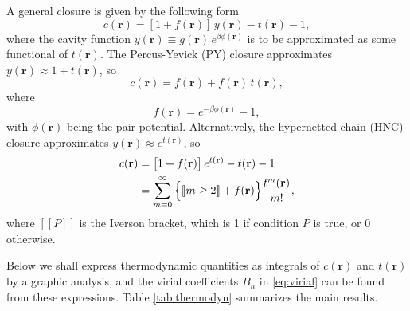 \documentclass[notitlepage,preprint]{revtex4-1}
\newcommand{\vct}[1]{\mathbf{#1}}
\providecommand{\vr}{} %
\renewcommand{\vr}{\vct{r}}
\newcommand{\llbra}{[\![}
\newcommand{\llket}{]\!]}
\begin{document}
A general closure is given by the following form
%
\begin{equation}
  c(\vr) = [1 + f(\vr)] \, y(\vr) - t(\vr) - 1,
  \label{eq:closure}
\end{equation}
%
where the cavity function $y(\vr) \equiv g(\vr) \, e^{ \beta \phi(\vr) }$
  is to be approximated as some functional of $t(\vr)$.
%
The Percus-Yevick (PY) closure\cite{percusyevick}
  approximates $y(\vr) \approx 1 + t(\vr)$, so
%
\begin{equation}
  c(\vr) = f(\vr) + f(\vr) \, t(\vr),
  \label{eq:py}
\end{equation}
where
\begin{equation}
  f(\vr) = e^{-\beta \phi(\vr)} - 1,
  \label{eq:fbond}
\end{equation}
with $\phi(\vr)$ being the pair potential.
%
Alternatively, the hypernetted-chain (HNC) closure\cite{
morita1958, *morita1959, *morita1960}
  approximates $y(\vr) \approx e^{ t(\vr) }$, so
%
\begin{align}
  c(\vr) &= \big[ 1 + f(\vr) \big] \, e^{t(\vr)} - t(\vr) - 1 \notag \\
         &= \sum_{m=0}^\infty
                \Big\{ \llbra m \ge 2 \llket + f(\vr) \Big\}
                \frac{ t^m(\vr) }{ m! },
  \label{eq:hnc}
\end{align}
%
where $\llbra P \llket$ is the Iverson bracket, which is 1 if condition $P$ is true, or 0 otherwise.

Below we shall express thermodynamic quantities
  as integrals of $c(\vr)$ and $t(\vr)$
  by a graphic analysis,
%
and the virial coefficients $B_n$ in \eqref{eq:virial}
  can be found from these expressions.
%
Table \ref{tab:thermodyn}
  summarizes the main results.

\ifdim \columnwidth < 4in
  \newcommand{\tabscale}{1.0}
\else
  \newcommand{\tabscale}{0.85}
\fi
\end{document}
